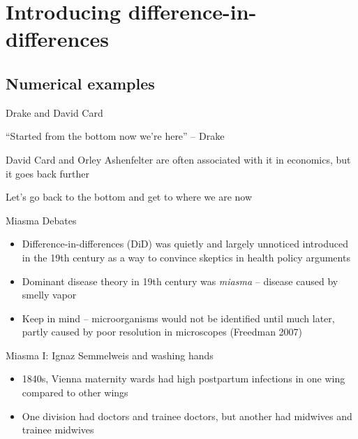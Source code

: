 \documentclass{beamer}
\begin{document}




\section{Introducing difference-in-differences}


\subsection{Numerical examples}

\begin{frame}{Drake and David Card}

``Started from the bottom now we're here'' -- Drake

\bigskip

David Card and Orley Ashenfelter are often associated with it in economics, but it goes back further

\bigskip

Let's go back to the bottom and get to where we are now

\end{frame}

\begin{frame}{Miasma Debates}

\begin{itemize}

\item Difference-in-differences (DiD) was quietly and largely unnoticed introduced in the 19th century as a way to convince skeptics in health policy arguments
\item Dominant disease theory in 19th century was \emph{miasma} -- disease caused by smelly vapor
\item Keep in mind -- microorganisms would not be identified until much later, partly caused by poor resolution in microscopes (Freedman 2007)

\end{itemize}

\end{frame}

\begin{frame}{Miasma I: Ignaz Semmelweis and washing hands}

\begin{itemize}
\item 1840s, Vienna maternity wards had high postpartum infections in one wing compared to other wings
\item One division had doctors and trainee doctors, but another had midwives and trainee midwives
\end{itemize}

\end{frame}
\end{document}
